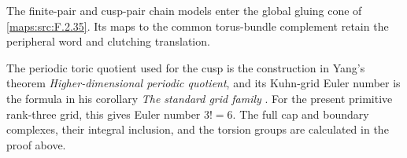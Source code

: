 The finite-pair and cusp-pair chain models enter the global
gluing cone of \cref{maps:src:F.2.35}. Its maps to the common
torus-bundle complement retain the peripheral word
and clutching translation.

The periodic toric quotient used for the cusp is the construction in
Yang's theorem \emph{Higher-dimensional periodic quotient}, and its
Kuhn-grid Euler number is the formula in his corollary
\emph{The standard grid family}
\cite[Theorem 8.7, pp.~57--59, and Corollary 8.8, p.~59, arXiv v1]{Yang2026}.
For the present primitive rank-three grid, this gives Euler number
$3!=6$.  The full cap and boundary complexes, their integral inclusion,
and the torsion groups are calculated in the proof above.








